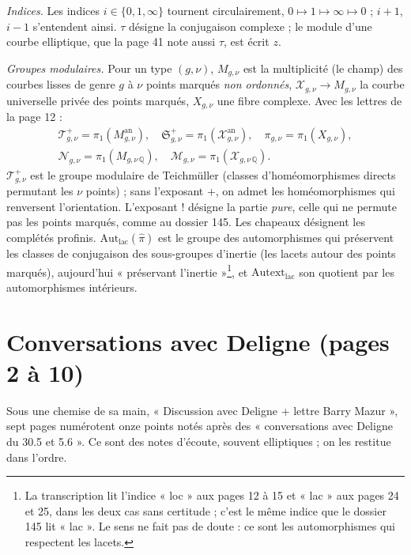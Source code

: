 \documentclass[11pt,a4paper]{article}
\begin{document}
\emph{Indices.} Les indices $i \in \{0, 1, \infty\}$ tournent
circulairement, $0 \mapsto 1 \mapsto \infty \mapsto 0$ ; $i + 1$, $i - 1$
s'entendent ainsi. $\tau$ désigne la conjugaison complexe ; le module d'une
courbe elliptique, que la page 41 note aussi $\tau$, est écrit $z$.

\emph{Groupes modulaires.} Pour un type $(g, \nu)$, $M_{g,\nu}$ est la
multiplicité (le champ) des courbes lisses de genre $g$ à $\nu$ points marqués
\emph{non ordonnés}, $\mathcal{X}_{g,\nu} \to M_{g,\nu}$ la courbe universelle
privée des points marqués, $X_{g,\nu}$ une fibre complexe. Avec les lettres de
la page 12 :
\[
\begin{gathered}
\mathcal{T}^{+}_{g,\nu} = \pi_1(M^{\mathrm{an}}_{g,\nu}), \quad
\mathfrak{S}^{+}_{g,\nu} = \pi_1(\mathcal{X}^{\mathrm{an}}_{g,\nu}), \quad
\pi_{g,\nu} = \pi_1(X_{g,\nu}), \\
\mathcal{N}_{g,\nu} = \pi_1(M_{g,\nu\,\mathbb{Q}}), \quad
\mathcal{M}_{g,\nu} = \pi_1(\mathcal{X}_{g,\nu\,\mathbb{Q}}) .
\end{gathered}
\]
$\mathcal{T}^{+}_{g,\nu}$ est le groupe modulaire de Teichmüller (classes
d'homéomorphismes directs permutant les $\nu$ points) ; sans l'exposant $+$,
on admet les homéomorphismes qui renversent l'orientation. L'exposant $!$
désigne la partie \emph{pure}, celle qui ne permute pas les points marqués,
comme au dossier 145. Les chapeaux désignent les complétés profinis.
$\mathrm{Aut}_{\mathrm{lac}}(\hat\pi)$ est le groupe des automorphismes
qui préservent les classes de conjugaison des sous-groupes d'inertie (les
lacets autour des points marqués), aujourd'hui « préservant
l'inertie »\footnote{La transcription lit l'indice « loc » aux pages 12 à 15 et
« lac » aux pages 24 et 25, dans les deux cas sans certitude ; c'est le même
indice que le dossier 145 lit « lac ». Le sens ne fait pas de doute : ce sont
les automorphismes qui respectent les lacets.}, et
$\mathrm{Autext}_{\mathrm{lac}}$ son quotient par les automorphismes
intérieurs.

\section*{Conversations avec Deligne (pages 2 à 10)}

Sous une chemise de sa main, « Discussion avec Deligne + lettre Barry Mazur »,
sept pages numérotent onze points notés après des « conversations avec
Deligne du 30.5 et 5.6 ». Ce sont des notes d'écoute, souvent elliptiques ; on
les restitue dans l'ordre.
\end{document}
